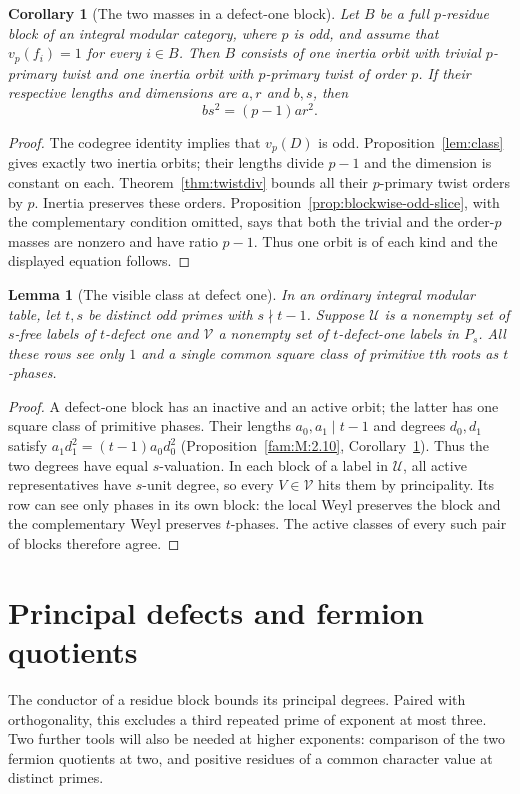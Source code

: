 \documentclass[11pt,a4paper]{article}
\numberwithin{equation}{section}
\newtheorem{lemma}[theorem]{Lemma}
\newtheorem{corollary}[theorem]{Corollary}
\theoremstyle{remark}
\begin{document}
\begin{corollary}[The two masses in a defect-one block]\label{fam:M:3.9}
\label{cor:defect-one-orbit-masses}
Let $B$ be a full $p$-residue block of an integral modular category,
where $p$ is odd, and assume that $v_p(f_i)=1$ for every $i\in B$.
Then $B$ consists of one inertia orbit with trivial $p$-primary twist
and one inertia orbit with $p$-primary twist of order $p$.
If their respective lengths and dimensions are $a,r$ and $b,s$, then
\[
                        b s^2=(p-1)a r^2.
\]
\end{corollary}
\begin{proof}
The codegree identity implies that $v_p(D)$ is odd. Proposition~\ref{lem:class}
gives exactly two inertia orbits; their lengths divide $p-1$ and
the dimension is constant on each. Theorem~\ref{thm:twistdiv} bounds
all their $p$-primary twist orders by $p$. Inertia preserves these
orders. Proposition~\ref{prop:blockwise-odd-slice}, with the
complementary condition omitted, says that both the trivial and the
order-$p$ masses are nonzero and have ratio $p-1$. Thus one orbit
is of each kind and the displayed equation follows.
\end{proof}

\begin{lemma}[The visible class at defect one]\label{lem:quintic-common-class}
In an ordinary integral modular table, let $t,s$ be distinct odd primes
with $s\nmid t-1$. Suppose $\mathcal U$ is a nonempty set of
$s$-free labels of $t$-defect one and $\mathcal V$ a nonempty set of
$t$-defect-one labels in $P_s$. All these rows see only $1$ and a
single common square class of primitive $t$th roots as $t$-phases.
\end{lemma}
\begin{proof}
A defect-one block has an inactive and an active orbit; the latter
has one square class of primitive phases. Their lengths
$a_0,a_1\mid t-1$ and degrees $d_0,d_1$ satisfy
$a_1d_1^2=(t-1)a_0d_0^2$
(Proposition~\ref{fam:M:2.10}, Corollary~\ref{fam:M:3.9}).
Thus the two degrees have equal $s$-valuation. In each block of a label
in $\mathcal U$, all active representatives have $s$-unit degree, so
every $V\in\mathcal V$ hits them by principality. Its row can see
only phases in its own block: the local Weyl preserves the block
and the complementary Weyl preserves $t$-phases. The active classes
of every such pair of blocks therefore agree.
\end{proof}

\section{Principal defects and fermion quotients}\label{fam:M:sec:4}\label{sec:three}
The conductor of a residue block bounds its principal degrees.
Paired with orthogonality, this excludes a third repeated prime of
exponent at most three. Two further tools will also be needed at
higher exponents: comparison of the two fermion quotients at two,
and positive residues of a common character value at distinct primes.
\end{document}

